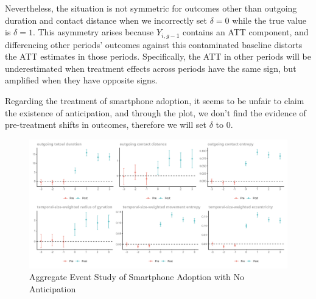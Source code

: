 Nevertheless, the situation is not symmetric for outcomes other than outgoing duration and contact distance when we incorrectly set \( \delta = 0 \) while the true value is \( \delta = 1 \).
This asymmetry arises because \( Y_{i,g-1} \) contains an ATT component, and differencing other periods' outcomes against this contaminated baseline distorts the ATT estimates in those periods.
Specifically, the ATT in other periods will be underestimated when treatment effects across periods have the same sign, but amplified when they have opposite signs.

Regarding the treatment of smartphone adoption, it seems to be unfair to claim the existence of anticipation, and through the plot, we don't find the evidence of pre-treatment shifts in outcomes, therefore we will set $\delta$ to 0.

\begin{figure}[h!]
\centering
\caption{Aggregate Event Study of Smartphone Adoption with No Anticipation}
\vspace{0.1cm}

\includegraphics[width=1\textwidth]{figures/csdid/inspect_delta/smartphone_adoption.png}

\label{fig:select_delta_smartphone_adoption}
\end{figure}
